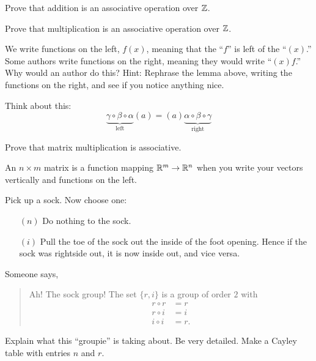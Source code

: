 \documentclass{ximera}
\begin{document}
\begin{exercise}
  Prove that addition is an associative operation  over $\mathbb Z$.
\end{exercise}

\begin{exercise}
  Prove that multiplication is an associative operation  over $\mathbb Z$.
\end{exercise}



\begin{exercise}
  We write functions on the left, $f(x)$, meaning that the ``$f$'' is
  left of the ``$(x)$.''  Some authors write functions on the right,
  meaning they would write ``$(x)f$.'' Why would an author do this? Hint:
  Rephrase the lemma above, writing the functions on the right, and
  see if you notice anything nice.
  \begin{hint}
    Think about this:
    \[
    \underbrace{\gamma\circ\beta\circ\alpha}_{\text{left}}(a) = (a)\underbrace{\alpha\circ\beta\circ\gamma}_{\text{right}}
    \]
  \end{hint}
\end{exercise}



\begin{exercise}
  Prove that matrix multiplication is associative.
  \begin{hint}
    An $n\times m$ matrix is a function mapping $\mathbb R^m\to \mathbb R^n$ when
    you write your vectors vertically and functions on the left.
  \end{hint}
\end{exercise}




\begin{exercise}
  Pick up a sock. Now choose one:
  \begin{enumerate}
  \item[$(n)$] Do nothing to the sock.
  \item[$(i)$] Pull the toe of the sock out the inside of the foot
    opening. Hence if the sock was rightside out, it is now inside
    out, and vice versa.
  \end{enumerate}
  Someone says,
  \begin{quote}
    Ah! The sock group! The set $\{r,i\}$ is a group of order $2$ with
    \begin{align*}
      r\circ r &= r\\
  r\circ i &= i\\
  i\circ i &= r.
  \end{align*}
  \end{quote}
  Explain what this ``groupie'' is taking about. Be very
  detailed. Make a Cayley table with entries $n$ and $r$. 
\end{exercise}
\end{document}
